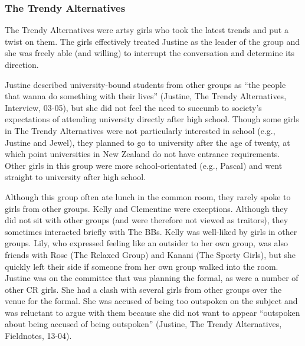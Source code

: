 \subsubsection{The Trendy Alternatives}
The Trendy Alternatives were artsy girls who took the latest trends and put a twist on them. The girls effectively treated Justine as the leader of the group and she was freely able (and willing) to interrupt the conversation and determine its direction.

Justine described university-bound students from other groups as ``the people that wanna do something with their lives'' (Justine, The Trendy Alternatives, Interview, 03-05), but she did not feel the need to succumb to society's expectations of attending university directly after high school. Though some girls in The Trendy Alternatives were not particularly interested in school (e.g., Justine and Jewel), they planned to go to university after the age of twenty, at which point universities in New Zealand do not have entrance requirements. Other girls in this group were more school-orientated (e.g., Pascal) and went straight to university after high school. 

\largerpage[-1] %
Although this group often ate lunch in the common room, they rarely spoke to girls from other groups. Kelly and Clementine were exceptions. Although they did not sit with other groups (and were therefore not viewed as traitors), they sometimes interacted briefly with The BBs. Kelly was well-liked by girls in other groups. Lily, who expressed feeling like an outsider to her own group, was also friends with Rose (The Relaxed Group) and Kanani (The Sporty Girls), but she quickly left their side if someone from her own group walked into the room. Justine was on the committee that was planning the formal, as were a number of other CR girls. She had a clash with several girls from other groups over the venue for the formal. She was accused of being too outspoken on the subject and was reluctant to argue with them because she did not want to appear ``outspoken about being accused of being outspoken'' (Justine, The Trendy Alternatives, Fieldnotes, 13-04).


